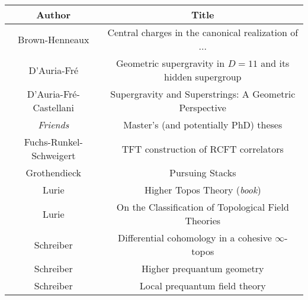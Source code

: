 \documentclass[11pt, a4paper]{report}
\begin{document}
    \begin{center}
        \begin{tabular}{|c|c|}
            \hline
            Author&Title\\
            \hline
            Brown-Henneaux&Central charges in the canonical realization of ...\\
			D'Auria-Fr\'e&Geometric supergravity in $D=11$ and its hidden supergroup\\
			D'Auria-Fr\'e-Castellani&Supergravity and Superstrings: A Geometric Perspective\\
            \textit{Friends}&Master's (and potentially PhD) theses\\
            Fuchs-Runkel-Schweigert&TFT construction of RCFT correlators\\
            Grothendieck&Pursuing Stacks\\
            Lurie&Higher Topos Theory (\textit{book})\\
            Lurie&On the Classification of Topological Field Theories\\
            Schreiber&Differential cohomology in a cohesive $\infty$-topos\\
            Schreiber&Higher prequantum geometry\\
            Schreiber&Local prequantum field theory\\
            \hline
        \end{tabular}
    \end{center}

%
%
%
%

\nomenclature[S_zsyminto]{$]a,b[$}{open interval}

\printnomenclature

\nocite{*}



\printindex
\end{document}
